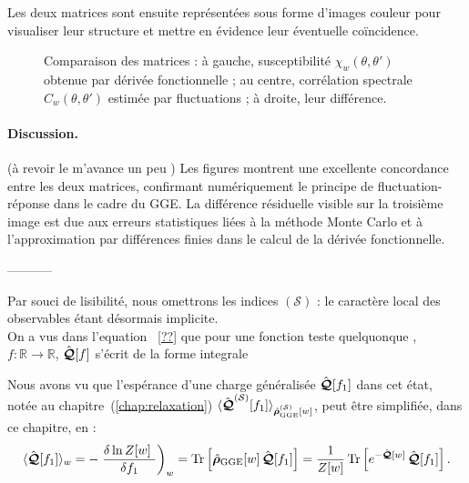 Les deux matrices sont ensuite représentées sous forme d'images couleur pour visualiser leur structure et mettre en évidence leur éventuelle coïncidence.

\begin{figure}[H]
    \centering
    \caption{Comparaison des matrices : à gauche, susceptibilité \( \chi_w(\theta,\theta') \) obtenue par dérivée fonctionnelle ; au centre, corrélation spectrale \( C_w(\theta,\theta') \) estimée par fluctuations ; à droite, leur différence.}
    \label{fig:comparison_chi_C}
\end{figure}

\paragraph{Discussion.}

{\color{blue} { (\color{red}à revoir le m'avance un peu )} Les figures montrent une excellente concordance entre les deux matrices, confirmant numériquement le principe de fluctuation-réponse dans le cadre du GGE. La différence résiduelle visible sur la troisième image est due aux erreurs statistiques liées à la méthode Monte Carlo et à l’approximation par différences finies dans le calcul de la dérivée fonctionnelle.} 

-----------

Par souci de lisibilité, nous omettrons les indices \((\mathcal{S})\) : le caractère local des observables étant désormais implicite.\\

On a vus dans l'equation ~\eqref{??} que pour une fonction teste quelquonque , $f \colon \mathbb{R} \to \mathbb{R}$, $\hat{\bm{\mathcal{Q}}}[f]$ s'écrit de la forme integrale 


Nous avons vu que l'espérance d'une charge généralisée \( \hat{\bm{\mathcal{Q}}}[f_1] \) dans cet état, notée au chapitre~(\ref{chap:relaxation}) \( \langle \hat{\bm{\mathcal{Q}}}^{(\mathcal{S})}[f_1] \rangle_{\hat{\bm{\rho}}_{\mathrm{GGE}}^{(\mathcal{S})}[w]} \), peut être simplifiée, dans ce chapitre, en :
\begin{eqnarray*}
	\langle \operator{\mathcal{Q}}[f_1] \rangle_w =  -  \left . \frac{ \delta \ln Z [w] }{ \delta f_1  } \right)_{w}  = \mathrm{Tr} \left[ \operator{\rho}_{\mathrm{GGE}}[w]\, \operator{\mathcal{Q}}[f_1] \right]
= \frac{1}{Z[w]}\, \mathrm{Tr} \left[ e^{-\operator{\mathcal{Q}}[w]}\, \operator{\mathcal{Q}}[f_1] \right] .	
\end{eqnarray*}

